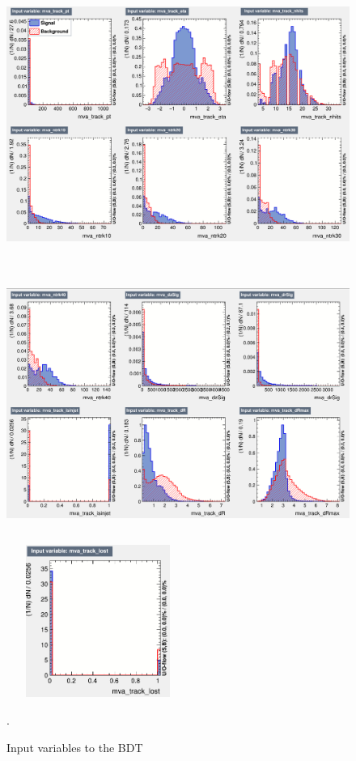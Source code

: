 \documentclass{cernatlasnote}
\begin{document}
\begin{appendices}
\begin{figure}[ht]
\centering
\includegraphics[height=9cm, width=14cm, trim= 0cm 0cm 0cm 0cm,clip]{images/TRKBDT/BDTDaniel_VAR1.png}
\includegraphics[height=9cm, width=14cm, trim= 0cm 0cm 0cm 0cm,clip]{images/TRKBDT/BDTDaniel_VAR2.png}
\includegraphics[height=5cm, width=6cm, trim= 0cm 0cm 0cm 0cm,clip]{images/TRKBDT/BDTDaniel_VAR3.png}
\caption{\label{fig:TRKInputs} Input variables to the BDT}.
\end{figure} 


\end{appendices}
\end{document}
